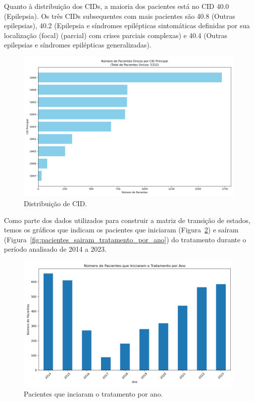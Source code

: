 \documentclass[article,a4paper,12pt,brazil,sumario=tradicional]{abntex2}
\begin{document}
Quanto à distribuição dos CIDs, a maioria dos pacientes está no CID 40.0 (Epilepsia). Os três CIDs subsequentes com mais pacientes são 40.8 (Outras epilepsias), 40.2 (Epilepsia e síndromes epilépticas sintomáticas definidas por sua localização (focal) (parcial) com crises parciais complexas) e 40.4 (Outras epilepsias e síndromes epilépticas generalizadas). 


\begin{figure}[!ht]
    \centering
    \includegraphics[width=1\textwidth]{contagem_cid_pacientes_unicos.png}
    \caption{Distribuição de CID.}
    \label{fig:contagem_cid_pacientes_unicos}
\end{figure}

Como parte dos dados utilizados para construir a matriz de transição de estados, temos os gráficos que indicam os pacientes que iniciaram (Figura~\ref{fig:pacientes_iniciaram_tratamento_por_ano}) e saíram (Figura~\ref{fig:pacientes_sairam_tratamento_por_ano}) do tratamento durante o período analisado de 2014 a 2023.

\begin{figure}[!ht]
    \centering
    \includegraphics[width=1\textwidth]{pacientes_iniciaram_tratamento_por_ano.png}
    \caption{Pacientes que inciaram o tratamento por ano.}
    \label{fig:pacientes_iniciaram_tratamento_por_ano}
\end{figure}
\end{document}
